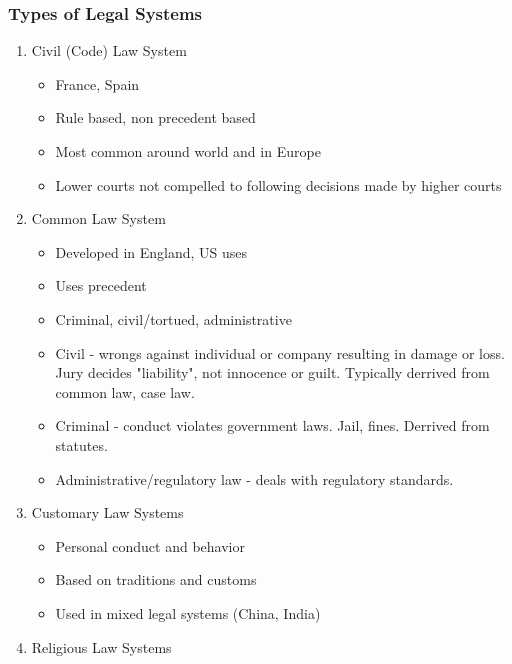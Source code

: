 \documentclass[11pt]{article}
\begin{document}
\subsubsection{Types of Legal Systems}
\label{sec:org632c839}
\begin{enumerate}
\item Civil (Code) Law System
\label{sec:orgcb829b9}
\begin{itemize}
\item France, Spain
\item Rule based, non precedent based
\item Most common around world and in Europe
\item Lower courts not compelled to following decisions made by higher courts
\end{itemize}
\item Common Law System
\label{sec:org75e46cb}
\begin{itemize}
\item Developed in England, US uses
\item Uses precedent
\item Criminal, civil/tortued, administrative
\item Civil - wrongs against individual or company resulting in damage or loss. Jury decides "liability", not innocence or guilt. Typically derrived from common law, case law.
\item Criminal - conduct violates government laws. Jail, fines. Derrived from statutes.
\item Administrative/regulatory law - deals with regulatory standards.
\end{itemize}
\item Customary Law Systems
\label{sec:orga34eb1d}
\begin{itemize}
\item Personal conduct and behavior
\item Based on traditions and customs
\item Used in mixed legal systems (China, India)
\end{itemize}
\item Religious Law Systems
\label{sec:org8205cd1}
\end{enumerate}
\end{document}
